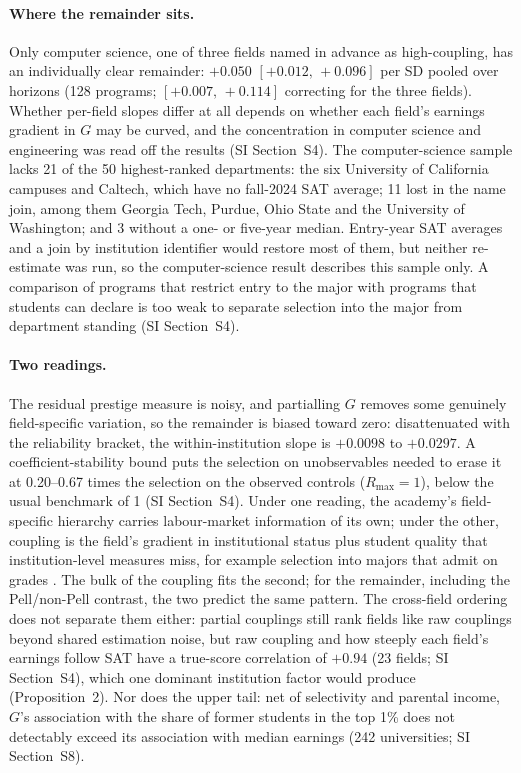 \documentclass[11pt]{article}
\newcommand{\SI}[1]{SI Section~S#1}
\newcommand{\ci}[2]{$[#1,\allowbreak\,#2]$}
\begin{document}
\paragraph{Where the remainder sits.} Only computer science, one of three fields named in advance as
high-coupling, has an individually clear remainder: $+0.050$ \ci{+0.012}{+0.096} per SD pooled over horizons (128
programs; \ci{+0.007}{+0.114} correcting for the three fields). Whether per-field slopes differ at all depends on
whether each field's earnings gradient in $G$ may be curved, and the concentration in computer science and
engineering was read off the results (\SI{4}). The computer-science sample lacks 21 of the 50 highest-ranked
departments: the six University of California campuses and Caltech, which have no fall-2024 SAT average; 11 lost
in the name join, among them Georgia Tech, Purdue, Ohio State and the University of Washington; and 3 without a
one- or five-year median. Entry-year SAT averages and a join by institution identifier would restore most of them, but neither
re-estimate was run, so the computer-science result describes this sample only. A comparison of programs that restrict entry to the major with programs that students can declare is too weak to
separate selection into the major from department standing (\SI{4}).

\paragraph{Two readings.} The residual prestige measure is noisy, and partialling $G$ removes some genuinely
field-specific variation, so the remainder is biased toward zero: disattenuated with the reliability bracket, the
within-institution slope is $+0.0098$ to $+0.0297$. A coefficient-stability bound \citep{oster2019unobservable}
puts the selection on unobservables needed to erase it at 0.20--0.67 times the selection on the observed controls
($R_{\max}=1$), below the usual benchmark of 1 (\SI{4}). Under one reading, the academy's field-specific hierarchy
carries labour-market information of its own; under the other, coupling is the field's gradient in institutional
status plus student quality that institution-level measures miss, for example selection into majors that admit on
grades \citep{bleemer2022will}. The bulk of the coupling fits the second; for the remainder, including the
Pell/non-Pell contrast, the two predict the same pattern. The cross-field ordering does not separate them either:
partial couplings still rank fields like raw couplings beyond shared estimation noise, but raw coupling and how
steeply each field's earnings follow SAT have a true-score correlation of $+0.94$ (23 fields; \SI{4}), which one
dominant institution factor would produce (Proposition~2). Nor does the upper tail: net of selectivity and parental income, $G$'s association with the share of former
students in the top 1\% does not detectably exceed its association with median earnings (242 universities;
\SI{8}).
\end{document}
